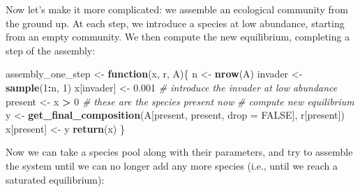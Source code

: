 \documentclass[]{book}
\newenvironment{Shaded}{\begin{snugshade}}{\end{snugshade}}
\newcommand{\CommentTok}[1]{\textcolor[rgb]{0.56,0.35,0.01}{\textit{#1}}}
\newcommand{\ControlFlowTok}[1]{\textcolor[rgb]{0.13,0.29,0.53}{\textbf{#1}}}
\newcommand{\DataTypeTok}[1]{\textcolor[rgb]{0.13,0.29,0.53}{#1}}
\newcommand{\DecValTok}[1]{\textcolor[rgb]{0.00,0.00,0.81}{#1}}
\newcommand{\FloatTok}[1]{\textcolor[rgb]{0.00,0.00,0.81}{#1}}
\newcommand{\KeywordTok}[1]{\textcolor[rgb]{0.13,0.29,0.53}{\textbf{#1}}}
\newcommand{\NormalTok}[1]{#1}
\newcommand{\OperatorTok}[1]{\textcolor[rgb]{0.81,0.36,0.00}{\textbf{#1}}}
\newcommand{\OtherTok}[1]{\textcolor[rgb]{0.56,0.35,0.01}{#1}}
\newcommand{\StringTok}[1]{\textcolor[rgb]{0.31,0.60,0.02}{#1}}
\begin{document}
Now let's make it more complicated: we assemble an ecological community from the ground up. At each step, we introduce a species at low abundance, starting from an empty community. We then compute the new equilibrium, completing a step of the assembly:

\begin{Shaded}
\begin{Highlighting}[]
\NormalTok{assembly_one_step <-}\StringTok{ }\ControlFlowTok{function}\NormalTok{(x, r, A)\{}
\NormalTok{  n <-}\StringTok{ }\KeywordTok{nrow}\NormalTok{(A)}
\NormalTok{  invader <-}\StringTok{ }\KeywordTok{sample}\NormalTok{(}\DecValTok{1}\OperatorTok{:}\NormalTok{n, }\DecValTok{1}\NormalTok{)}
\NormalTok{  x[invader] <-}\StringTok{ }\FloatTok{0.001} \CommentTok{# introduce the invader at low abundance}
\NormalTok{  present <-}\StringTok{ }\NormalTok{x }\OperatorTok{>}\StringTok{ }\DecValTok{0} \CommentTok{# these are the species present now}
  \CommentTok{# compute new equilibrium}
\NormalTok{  y <-}\StringTok{ }\KeywordTok{get_final_composition}\NormalTok{(A[present, present, }\DataTypeTok{drop =} \OtherTok{FALSE}\NormalTok{], r[present])}
\NormalTok{  x[present] <-}\StringTok{ }\NormalTok{y}
  \KeywordTok{return}\NormalTok{(x)}
\NormalTok{\}}
\end{Highlighting}
\end{Shaded}

Now we can take a species pool along with their parameters, and try to assemble the system until we can no longer add any more species (i.e., until we reach a saturated equilibrium):
\end{document}
